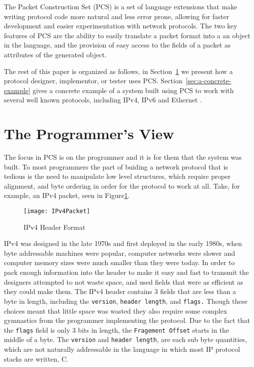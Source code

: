 \documentclass{sig-alternate-10pt}
\begin{document}
The Packet Construction Set (PCS) is a set of language extensions that
make writing protocol code more natural and less error prone, allowing
for faster development and easier experimentation with network
protocols.  The two key features of PCS are the ability to easily
translate a packet format into a an object in the language, and the
provision of easy access to the fields of a packet as attributes of
the generated object.

The rest of this paper is organized as follows, in
Section~\ref{sec:the-programmers-view} we present how a protocol
designer, implementor, or tester uses PCS.
Section~\ref{sec:a-concrete-example} gives a concrete example of a
system built using PCS to work with several well known protocols,
including IPv4\cite{rfc791}, IPv6\cite{rfc2460} and Ethernet \cite{}.

\section{The Programmer's View}
\label{sec:the-programmers-view}

The focus in PCS is on the programmer and it is for them that the
system was built.  To most programmers the part of buiding a network
protocol that is tedious is the need to manipulate low level
structures, which require proper alignment, and byte ordering in order
for the protocol to work at all.  Take, for example, an IPv4 packet,
seen in Figure\ref{fig:rfc791-ipheader}.

\begin{figure}
  \centering
\label{fig:rfc791-ipheader}
\texttt{[image: IPv4Packet]}
  \caption{IPv4 Header Format}
\end{figure}

IPv4 was designed in the late 1970s and first deployed in the early
1980s, when byte addressable machines were popular, computer networks
were slower and computer memory sizes were much smaller than they were
today.  In order to pack enough information into the header to make it
easy and fast to transmit the designers attempted to not waste space,
and used fields that were as efficient as they could make them.  The
IPv4 header contains 3 fields that are less than a byte in length,
including the \verb|version|, \verb|header length|, and \verb|flags.|
Though these choices meant that little space was wasted they also
require some complex gymnastics from the programmer implementing the
protocol.  Due to the fact that the \verb|flags| field is only 3 bits
in length, the \verb|Fragement Offset| starts in the middle of a
byte.  The \verb|version| and \verb|header length|, are each sub byte
quantities, which are not naturally addressable in the language in
which most IP protocol stacks are written, C.
\end{document}
